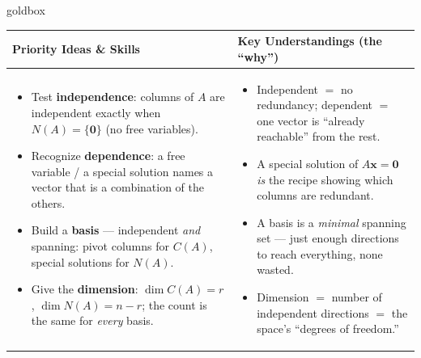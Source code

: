 \documentclass[10pt]{article}
\newcommand{\xx}{\mathbf{x}}
\newcommand{\zero}{\mathbf{0}}
\begin{document}
\renewcommand{\arraystretch}{1.4}
\begin{skillbox}{goldbox}
\begin{tabularx}{\linewidth}{@{}X|X@{}}
\textbf{Priority Ideas \& Skills} & \textbf{Key Understandings (the ``why'')} \\[2pt]
\hline
\vspace{-6pt}
\begin{itemize}[leftmargin=1.1em, nosep, after=\vspace{2pt}]
  \item Test \textbf{independence}: columns of $A$ are independent exactly when $N(A)=\{\zero\}$ (no free variables).
  \item Recognize \textbf{dependence}: a free variable / a special solution names a vector that is a combination of the others.
  \item Build a \textbf{basis} --- independent \emph{and} spanning: pivot columns for $C(A)$, special solutions for $N(A)$.
  \item Give the \textbf{dimension}: $\dim C(A)=r$, $\dim N(A)=n-r$; the count is the same for \emph{every} basis.
\end{itemize}
&
\vspace{-6pt}
\begin{itemize}[leftmargin=1.1em, nosep, after=\vspace{2pt}]
  \item Independent $=$ no redundancy; dependent $=$ one vector is ``already reachable'' from the rest.
  \item A special solution of $A\xx=\zero$ \emph{is} the recipe showing which columns are redundant.
  \item A basis is a \emph{minimal} spanning set --- just enough directions to reach everything, none wasted.
  \item Dimension $=$ number of independent directions $=$ the space's ``degrees of freedom.''
\end{itemize}
\end{tabularx}
\end{skillbox}
\end{document}
